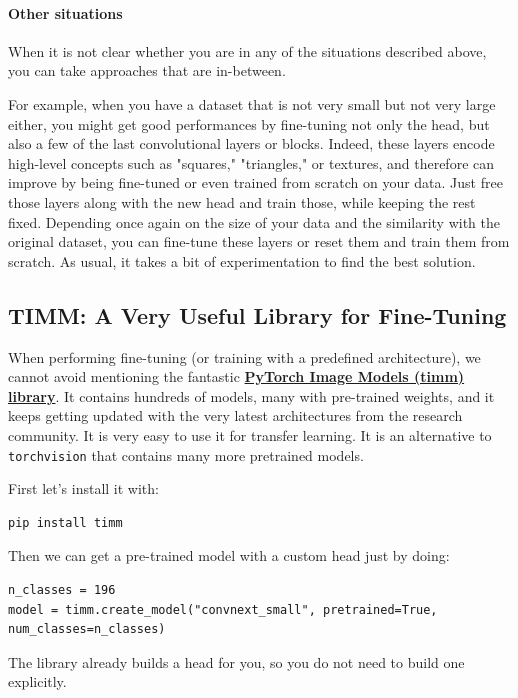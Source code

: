 \paragraph{Other situations}

When it is not clear whether you are in any of the situations described above, you can take approaches that are in-between.\newline

For example, when you have a dataset that is not very small but not very large either, you might get good performances by fine-tuning not only the head, but also a few of the last convolutional layers or blocks. Indeed, these layers encode high-level concepts such as "squares," "triangles," or textures, and therefore can improve by being fine-tuned or even trained from scratch on your data. Just free those layers along with the new head and train those, while keeping the rest fixed. Depending once again on the size of your data and the similarity with the original dataset, you can fine-tune these layers or reset them and train them from scratch. As usual, it takes a bit of experimentation to find the best solution.

\subsection{TIMM: A Very Useful Library for Fine-Tuning}

When performing fine-tuning (or training with a predefined architecture), we cannot avoid mentioning the fantastic \href{https://github.com/rwightman/pytorch-image-models}{\textbf{PyTorch Image Models (timm) library}}. It contains hundreds of models, many with pre-trained weights, and it keeps getting updated with the very latest architectures from the research community. It is very easy to use it for transfer learning. It is an alternative to \verb|torchvision| that contains many more pretrained models.

First let's install it with:
\begin{lstlisting}
pip install timm
\end{lstlisting}
Then we can get a pre-trained model with a custom head just by doing:
\begin{lstlisting}
n_classes = 196
model = timm.create_model("convnext_small", pretrained=True, num_classes=n_classes)
\end{lstlisting}
The library already builds a head for you, so you do not need to build one explicitly. \newline

